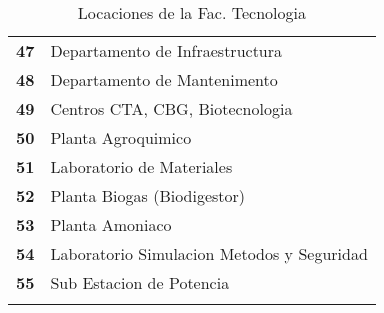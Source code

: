 \begin{longtable}{ c  X }
      \textbf{47}
      &
      Departamento de Infraestructura
      \\


      \textbf{48}
      &
      Departamento de Mantenimento
      \\


      \textbf{49}
      &
      Centros CTA, CBG, Biotecnologia
      \\


      \textbf{50}
      &
      Planta Agroquimico
      \\


      \textbf{51}
      &
      Laboratorio de Materiales
      \\


      \textbf{52}
      &
      Planta Biogas (Biodigestor)
      \\

      \textbf{53}
      &
      Planta Amoniaco
      \\


      \textbf{54}
      &
      Laboratorio Simulacion Metodos y Seguridad
      \\

      \textbf{55}
      &
      Sub Estacion de Potencia
      \\

      \bottomrule
      \caption{Locaciones de la Fac. Tecnologia}
      \label{tab:lugares_tecnologia}
    \end{longtable}
